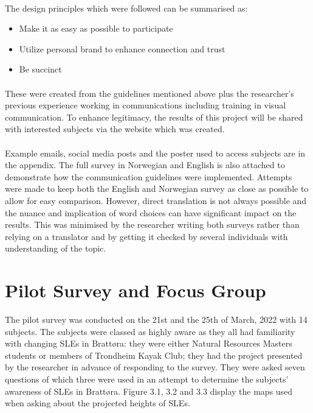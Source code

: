 \paragraph{}

The design principles which were followed can be summarised as:
\begin{itemize}
    \item Make it as easy as possible to participate
    \item Utilize personal brand to enhance connection and trust
    \item Be succinct
\end{itemize}
\paragraph{}
These were created from the guidelines mentioned above plus the researcher's previous experience working in communications including training in visual communication. To enhance legitimacy, the results of this project will be shared with interested subjects via the website which was created.
\paragraph{}
Example emails, social media posts and the poster used to access subjects are in the appendix. The full survey in Norwegian and English is also attached to demonstrate how the communication guidelines were implemented. Attempts were made to keep both the English and Norwegian survey as close as possible to allow for easy comparison. However, direct translation is not always possible and the nuance and implication of word choices can have significant impact on the results. This was minimised by the researcher writing both surveys rather than relying on a translator and by getting it checked by several individuals with understanding of the topic.

\section{Pilot Survey and Focus Group}

The pilot survey was conducted on the 21st and the 25th of March, 2022 with 14 subjects. The subjects were classed as highly aware as they all had familiarity with changing SLEs in Brattøra: they were either Natural Resources Masters students or members of Trondheim Kayak Club; they had the project presented by the researcher in advance of responding to the survey. They were asked seven questions of which three were used in an attempt to determine the subjects' awareness of SLEs in Brattøra. Figure 3.1, 3.2 and 3.3 display the maps used when asking about the projected heights of SLEs.

